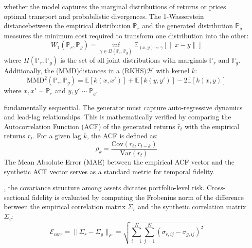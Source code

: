 whether the model captures the marginal distributions of returns or prices \revdeldec{ , }optimal transport and probabilistic divergences. The 1-Wasserstein distancebetween the empirical distribution $\mathbb{P}_r$ and the generated distribution $\mathbb{P}_g$ measures the minimum cost required to transform one distribution into the other:
    \begin{equation}
        W_1(\mathbb{P}_r, \mathbb{P}_g) = \inf_{\gamma \in \Pi(\mathbb{P}_r, \mathbb{P}_g)} \mathbb{E}_{(x,y)\sim \gamma}[\|x-y\|]
    \end{equation}
    where $\Pi(\mathbb{P}_r, \mathbb{P}_g)$ is the set of all joint distributions with marginals $\mathbb{P}_r$ and $\mathbb{P}_g$. Additionally, the (MMD)distances in a (RKHS)$\mathcal{H}$ with kernel $k$:
    \begin{equation}
        \text{MMD}^2(\mathbb{P}_r, \mathbb{P}_g) = \mathbb{E}[k(x, x')] + \mathbb{E}[k(y, y')] - 2\mathbb{E}[k(x, y)]
    \end{equation}
    where $x, x' \sim \mathbb{P}_r$ and $y, y' \sim \mathbb{P}_g$.

fundamentally sequential. The generator must capture auto-regressive dynamics and lead-lag relationships. This is mathematically verified by comparing the Autocorrelation Function (ACF) of the generated returns $\hat{r}_t$ with the empirical returns $r_t$. For a given lag $k$, the ACF is defined as:
    \begin{equation}
        \rho_k = \frac{\text{Cov}(r_t, r_{t-k})}{\text{Var}(r_t)}
    \end{equation}
The Mean Absolute Error (MAE) between the empirical ACF vector and the synthetic ACF vector serves as a standard metric for temporal fidelity.

, the covariance structure among assets dictates portfolio-level risk. Cross-sectional fidelity is evaluated by computing the Frobenius norm of the difference between the empirical correlation matrix $\Sigma_r$ and the synthetic correlation matrix $\Sigma_g$:
    \begin{equation}
        \mathcal{E}_{corr} = \|\Sigma_r - \Sigma_g\|_F = \sqrt{\sum_{i=1}^N \sum_{j=1}^N (\sigma_{r, ij} - \sigma_{g, ij})^2}
    \end{equation}


